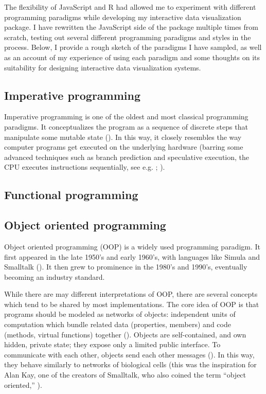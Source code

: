 \documentclass[
]{book}
\theoremstyle{definition}
\theoremstyle{definition}
\theoremstyle{definition}
\theoremstyle{definition}
\theoremstyle{remark}
\begin{document}
The flexibility of JavaScript and R had allowed me to experiment with different programming paradigms while developing my interactive data visualization package. I have rewritten the JavaScript side of the package multiple times from scratch, testing out several different programming paradigms and styles in the process. Below, I provide a rough sketch of the paradigms I have sampled, as well as an account of my experience of using each paradigm and some thoughts on its suitability for designing interactive data visualization systems.

\subsection{Imperative programming}\label{imperative-programming}

Imperative programming is one of the oldest and most classical programming paradigms. It conceptualizes the program as a sequence of discrete steps that manipulate some mutable state (). In this way, it closely resembles the way computer programs get executed on the underlying hardware (barring some advanced techniques such as branch prediction and speculative execution, the CPU executes instructions sequentially, see e.g. ; ).

\subsection{Functional programming}\label{functional-programming}

\subsection{Object oriented programming}\label{object-oriented-programming}

Object oriented programming (OOP) is a widely used programming paradigm. It first appeared in the late 1950's and early 1960's, with languages like Simula and Smalltalk (). It then grew to prominence in the 1980's and 1990's, eventually becoming an industry standard.

While there are may different interpretations of OOP, there are several concepts which tend to be shared by most implementations. The core idea of OOP is that programs should be modeled as networks of objects: independent units of computation which bundle related data (properties, members) and code (methods, virtual functions) together (). Objects are self-contained, and own hidden, private state; they expose only a limited public interface. To communicate with each other, objects send each other messages (). In this way, they behave similarly to networks of biological cells (this was the inspiration for Alan Kay, one of the creators of Smalltalk, who also coined the term ``object oriented,'' ).
\end{document}
